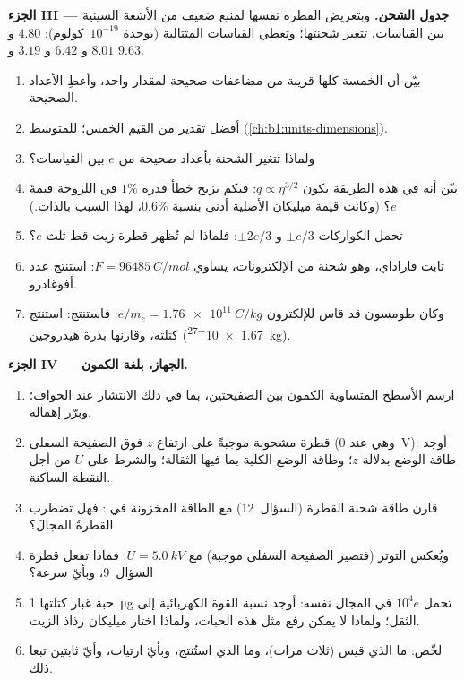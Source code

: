 \begin{problem}
\medskip
\noindent\textbf{الجزء III --- جدول الشحن.}
وبتعريض القطرة نفسها لمنبع ضعيف من الأشعة السينية بين القياسات،
تتغير شحنتها؛ وتعطي القياسات المتتالية (بوحدة $10^{-19}$~كولوم):
$4.80$ و $8.01$ و $6.42$ و $3.19$ و $9.63$.
\begin{enumerate}[resume]
  \item بيّن أن الخمسة كلها قريبة من مضاعفات صحيحة لمقدار
        واحد، وأعطِ الأعداد الصحيحة.
  \item أفضل تقدير  من القيم الخمس؛
         للمتوسط (\cref{ch:b1:units-dimensions}).
  \item ولماذا تتغير الشحنة بأعداد صحيحة من $e$ بين
        القياسات؟
  \item بيّن أنه في هذه الطريقة يكون $q \propto \eta^{3/2}$: فبكم يزيح
        خطأ قدره $1\%$ في اللزوجة قيمةَ $e$؟ (وكانت قيمة ميليكان الأصلية
        أدنى بنسبة $0.6\%$، لهذا السبب بالذات.)
  \item تحمل الكواركات $\pm e/3$ و $\pm 2e/3$: فلماذا لم تُظهر قطرة زيت قط
        ثلث $e$؟
  \item ثابت فاراداي، وهو شحنة  من الإلكترونات، يساوي
        $F = \qty{96485}{C/mol}$: استنتج عدد أفوغادرو.
  \item وكان طومسون قد قاس للإلكترون $e/m_e = \qty{1.76e11}{C/kg}$:
        فاستنتج: استنتج كتلته، وقارنها بذرة هيدروجين
        (\qty{1.67e-27}{kg}).
\end{enumerate}

\medskip
\noindent\textbf{الجزء IV --- الجهاز، بلغة الكمون.}
\begin{enumerate}[resume]
  \item ارسم الأسطح المتساوية الكمون  بين الصفيحتين،
        بما في ذلك الانتشار عند الحواف؛ وبرّر إهماله.
  \item قطرة مشحونة موجبةً على ارتفاع $z$ فوق الصفيحة السفلى
        (وهي عند \qty{0}{V}): أوجد طاقة الوضع بدلالة $z$؛ وطاقة الوضع
        الكلية بما فيها الثقالة؛ والشرط على $U$ من أجل النقطة الساكنة.
  \item قارن طاقة شحنة القطرة (السؤال~12) مع
        الطاقة المخزونة في : فهل تضطرب القطرةُ المجالَ؟
  \item ويُعكس التوتر (فتصير الصفيحة السفلى موجبة) مع
        $U = \qty{5.0}{kV}$: فماذا تفعل قطرة السؤال~9، وبأيّ
        سرعة؟
  \item حبة غبار كتلتها \qty{1}{\micro g} تحمل $10^4e$ في المجال
        نفسه: أوجد نسبة القوة الكهربائية إلى الثقل؛ ولماذا لا يمكن رفع مثل
        هذه الحبات، ولماذا اختار ميليكان رذاذ الزيت.
  \item لخّص: ما الذي قيس (ثلاث مرات)، وما الذي استُنتج،
        وبأيّ ارتياب، وأيّ ثابتين تبعا ذلك.
\end{enumerate}
\end{problem}
